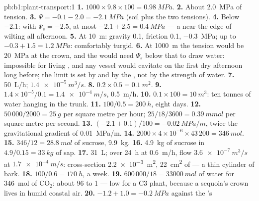 \begin{solution}{pb:b1:plant-transport:1}
\textbf{1.} $1000\times 9.8\times 100 = \qty{0.98}{MPa}$.
\textbf{2.} About \qty{2.0}{MPa} of tension.
\textbf{3.} $\Psi = -0.1 - 2.0 = \qty{-2.1}{MPa}$ (soil plus the two
tensions).
\textbf{4.} Below \qty{-2.1}{}: with $\Psi_s = -2.5$,  at most
$-2.1 + 2.5 = \qty{0.4}{MPa}$ --- a  near the edge of wilting all
afternoon.
\textbf{5.} At \qty{10}{m}: gravity \qty{0.1}{}, friction \qty{0.1}{},
 \qty{-0.3}{MPa};   up to $-0.3 + 1.5 = \qty{1.2}{MPa}$:
comfortably turgid.
\textbf{6.} At \qty{1000}{m} the tension would be \qty{20}{MPa} at
the crown, and the  would need $\Psi_s$ below that to draw
water: impossible for living , and any vessel would cavitate on
the first dry afternoon long before; the limit is set by 
and by the , not by the strength of water.
\textbf{7.} \qty{50}{L/h}; $\qty{1.4e-5}{m^3/s}$.
\textbf{8.} $0.2\times 0.5 = \qty{0.1}{m^2}$.
\textbf{9.} $1.4\times 10^{-5}/0.1 = \qty{1.4e-4}{m/s}$, \qty{0.5}{m/h}.
\textbf{10.} $0.1\times 100 = \qty{10}{m^3}$: ten tonnes of water hanging in the trunk.
\textbf{11.} $100/0.5 = \qty{200}{h}$, eight days.
\textbf{12.} $50\,000/2000 = \qty{25}{g}$ per square metre per hour;
$25/18/3600 = \qty{0.39}{mmol}$ per square metre per second.
\textbf{13.} $(-2.1 + 0.1)/100 = \qty{-0.02}{MPa/m}$, twice the
gravitational gradient of \qty{0.01}{MPa/m}.
\textbf{14.} $2000\times 4\times 10^{-6}\times 43\,200 = \qty{346}{mol}$.
\textbf{15.} $346/12 = \qty{28.8}{mol}$ of sucrose, \qty{9.9}{kg}.
\textbf{16.} \qty{4.9}{kg} of sucrose in $4.9/0.15 = \qty{33}{kg}$ of
sap.
\textbf{17.} \qty{31}{L}; over \qty{24}{h} at \qty{0.6}{m/h}, flow
$\qty{3.6e-7}{m^3/s}$ at $\qty{1.7e-4}{m/s}$: cross-section
\qty{2.2e-3}{m^2}, \qty{22}{cm^2} of  --- a thin cylinder of
bark.
\textbf{18.} $100/0.6 = \qty{170}{h}$, a week.
\textbf{19.} $600\,000/18 = \qty{33000}{mol}$ of water for
\qty{346}{mol} of $\mathrm{CO_2}$: about 96 to 1 --- low for a C3 plant,
because a sequoia's crown lives in humid coastal air.
\textbf{20.} $-1.2 + 1.0 = \qty{-0.2}{MPa}$ against the 's

\end{solution}
